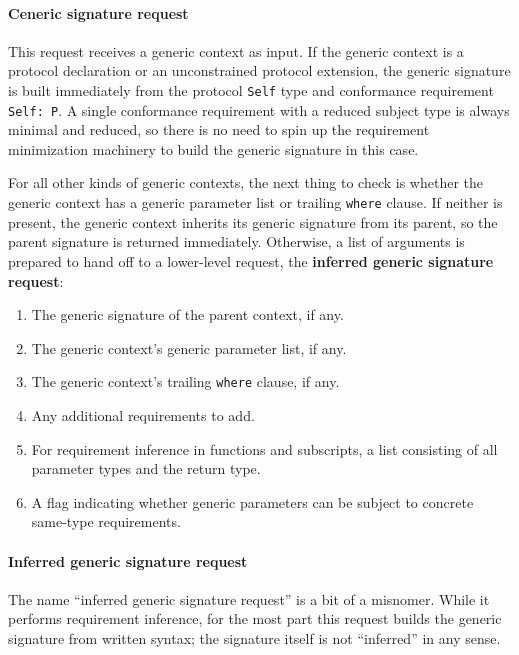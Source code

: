 \documentclass[a4paper,headsepline,bibliography=totoc,toc=flat,fleqn,twoside=semi]{scrbook}
\theoremstyle{definition}
\theoremstyle{definition}
\theoremstyle{definition}
\begin{document}
\paragraph{Ceneric signature request} This request receives a generic context as input. If the generic context is a protocol declaration or an unconstrained protocol extension, the generic signature is built immediately from the protocol \texttt{Self} type and conformance requirement \texttt{Self:~P}. A single conformance requirement with a reduced subject type is always minimal and reduced, so there is no need to spin up the requirement minimization machinery to build the generic signature in this case.

For all other kinds of generic contexts, the next thing to check is whether the generic context has a generic parameter list or trailing \texttt{where} clause. If neither is present, the generic context inherits its generic signature from its parent, so the parent signature is returned immediately. Otherwise, a list of arguments is prepared to hand off to a lower-level request, the \textbf{inferred generic signature request}:
\begin{enumerate}
\item The generic signature of the parent context, if any.
\item The generic context's generic parameter list, if any.
\item The generic context's trailing \texttt{where} clause, if any.
\item Any additional requirements to add.
\item For requirement inference in functions and subscripts, a list consisting of all parameter types and the return type.
\item A flag indicating whether generic parameters can be subject to concrete same-type requirements.
\end{enumerate}

\paragraph{Inferred generic signature request} The name ``inferred generic signature request'' is a bit of a misnomer. While it performs requirement inference, for the most part this request builds the generic signature from written syntax; the signature itself is not ``inferred'' in any sense.
\end{document}
